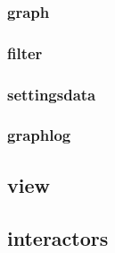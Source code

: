     \subsubsection{graph}

    \subsubsection{filter}

    \subsubsection{settingsdata}

    \subsubsection{graphlog}


\subsection{view}

\subsection{interactors}
